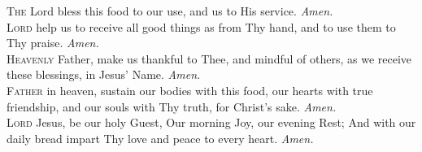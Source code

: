 \lettrine{T}{he} Lord bless this food to our use, and us to His service.
\textit{Amen.} \\

\lettrine{L}{ord} help us to receive all good things as from Thy
hand, and to use them to Thy praise.
\textit{Amen.} \\

\lettrine{H}{eavenly} Father, make us thankful to Thee, and
mindful of others, as we receive these blessings, in
Jesus’ Name.
\textit{Amen.} \\

\lettrine{F}{ather} in heaven, sustain our bodies with this food,
our hearts with true friendship, and our souls with Thy
truth, for Christ’s sake.
\textit{Amen.} \\

\lettrine{L}{ord} Jesus, be our holy Guest,
Our morning Joy, our evening Rest;
And with our daily bread impart
Thy love and peace to every heart.
\textit{Amen.} \\
